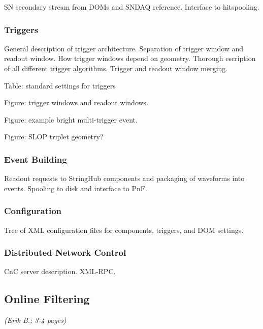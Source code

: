 SN secondary stream from DOMs and SNDAQ reference.  Interface to
hitspooling.  

\subsubsection{Triggers}

General description of trigger architecture.  Separation of trigger window
and readout window.  How trigger windows depend on geometry.  Thorough
escription of all different trigger algorithms. Trigger and readout window
merging. 


Table: standard settings for triggers

Figure: trigger windows and readout windows.

Figure: example bright multi-trigger event.  

Figure: SLOP triplet geometry?

\subsubsection{Event Building}

Readout requests to StringHub components and packaging of waveforms into
events.  Spooling to disk and interface to PnF.


\subsubsection{Configuration}

Tree of XML configuration files for components, triggers, and DOM settings.  

\subsubsection{Distributed Network Control}

CnC server description.  XML-RPC.  

\subsection{Online Filtering}
\textsl{(Erik B.; 3-4 pages)}
